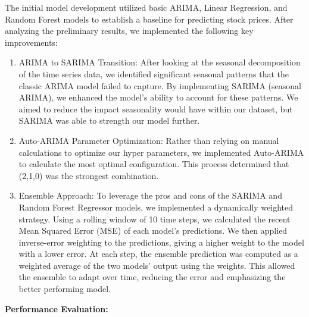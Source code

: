 \documentclass[conference]{IEEEtran}
\begin{document}
The initial model development utilized basic ARIMA, Linear Regression, and Random Forest models to establish a baseline for predicting stock prices. After analyzing the preliminary results, we implemented the following key improvements:

\begin{enumerate}
    \item ARIMA to SARIMA Transition: After looking at the seasonal decomposition of the time series data, we identified significant seasonal patterns that the classic ARIMA model failed to capture. By implementing SARIMA (seasonal ARIMA), we enhanced the model’s ability to account for these patterns. We aimed to reduce the impact seasonality would have within our dataset, but SARIMA was able to strength our model further.

    \item Auto-ARIMA Parameter Optimization: Rather than relying on manual calculations to optimize our hyper parameters, we implemented Auto-ARIMA to calculate the most optimal configuration. This process determined that (2,1,0) was the strongest combination.

    \item Ensemble Approach: To leverage the pros and cons of the SARIMA and Random Forest Regressor models, we implemented a dynamically weighted strategy. Using a rolling window of 10 time steps, we calculated the recent Mean Squared Error (MSE) of each model’s predictions. We then applied inverse-error weighting to the predictions, giving a higher weight to the model with a lower error. At each step, the ensemble prediction was computed as a weighted average of the two models’ output using the weights. This allowed the ensemble to adapt over time, reducing the error and emphasizing the better performing model.

\end{enumerate}


\textbf{Performance Evaluation:}
\end{document}
